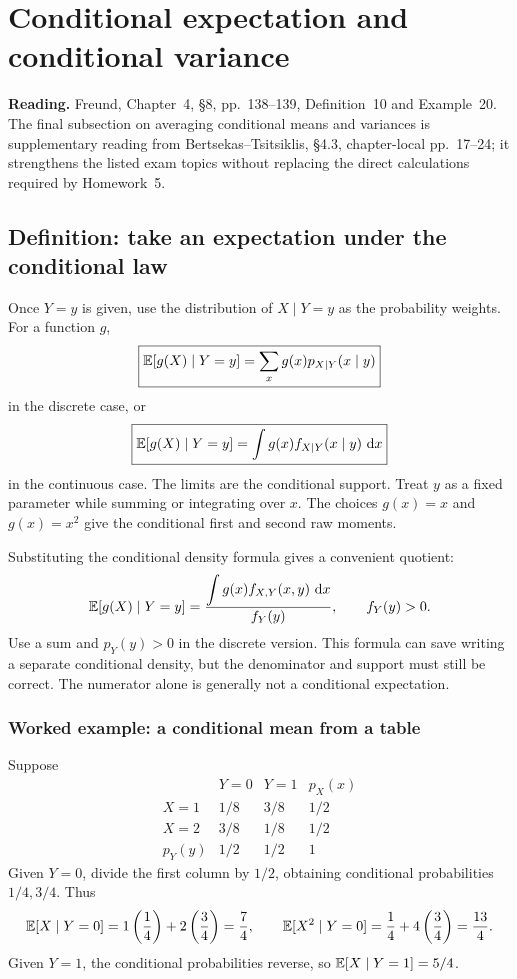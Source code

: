 \section{Conditional expectation and conditional variance}
\label{sec:conditional}
\noindent\textbf{Reading.} Freund, Chapter~4, \S8, pp.~138--139, Definition~10 and Example~20. The final subsection on averaging conditional means and variances is supplementary reading from Bertsekas--Tsitsiklis, \S4.3, chapter-local pp.~17--24; it strengthens the listed exam topics without replacing the direct calculations required by Homework~5.

\subsection{Definition: take an expectation under the conditional law}
Once $Y=y$ is given, use the distribution of $X\mid Y=y$ as the probability weights. For a function $g$,
\[
\boxed{\mathbb E[g(X)\mid Y=y]=\sum_x g(x)p_{X\mid Y}(x\mid y)}
\]
in the discrete case, or
\[
\boxed{\mathbb E[g(X)\mid Y=y]=\int g(x)f_{X\mid Y}(x\mid y)\,\,\mathrm d x}
\]
in the continuous case. The limits are the conditional support. Treat $y$ as a fixed parameter while summing or integrating over $x$. The choices $g(x)=x$ and $g(x)=x^2$ give the conditional first and second raw moments.

Substituting the conditional density formula gives a convenient quotient:
\[
 \mathbb E[g(X)\mid Y=y]
 =\frac{\displaystyle\int g(x)f_{X,Y}(x,y)\,\,\mathrm d x}{f_Y(y)},
 \qquad f_Y(y)>0.
\]
Use a sum and $p_Y(y)>0$ in the discrete version. This formula can save writing a separate conditional density, but the denominator and support must still be correct. The numerator alone is generally not a conditional expectation.

\subsubsection*{Worked example: a conditional mean from a table}
Suppose
\[
\begin{array}{c|cc|c}
 &Y=0&Y=1&p_X(x)\\\hline
X=1&1/8&3/8&1/2\\
X=2&3/8&1/8&1/2\\\hline
p_Y(y)&1/2&1/2&1
\end{array}
\]
Given $Y=0$, divide the first column by $1/2$, obtaining conditional probabilities $1/4,3/4$. Thus
\[
 \mathbb E[X\mid Y=0]=1\left(\frac14\right)+2\left(\frac34\right)=\frac74,
 \qquad
 \mathbb E[X^2\mid Y=0]=\frac14+4\left(\frac34\right)=\frac{13}{4}.
\]
Given $Y=1$, the conditional probabilities reverse, so $\mathbb E[X\mid Y=1]=5/4$.


